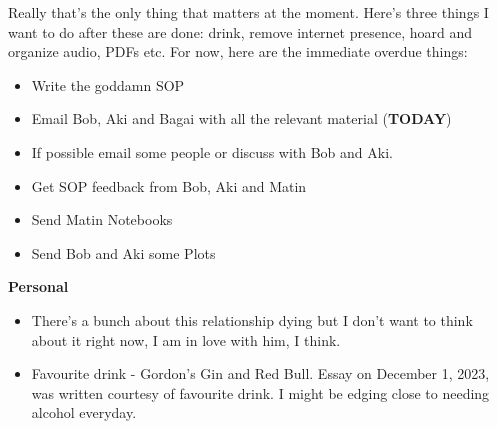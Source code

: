 \noindent {}

Really that's the only thing that matters at the moment. Here's three things I want to do after these are done: drink, remove internet presence, hoard and organize audio, PDFs etc. For now, here are the immediate overdue things:
\begin{itemize}
    \item Write the goddamn SOP
    \item Email Bob, Aki and Bagai with all the relevant material (\textbf{TODAY})
    \item If possible email some people or discuss with Bob and Aki. 
    \item Get SOP feedback from Bob, Aki and Matin
    \item Send Matin Notebooks
    \item Send Bob and Aki some Plots
\end{itemize}

\noindent \textbf{Personal}\\
\begin{itemize}
    \item There's a bunch about this relationship dying but I don't want to think about it right now, I am in love with him, I think.
    \item Favourite drink - Gordon's Gin and Red Bull. Essay on December 1, 2023, was written courtesy of favourite drink. I might be edging close to needing alcohol everyday.
\end{itemize}